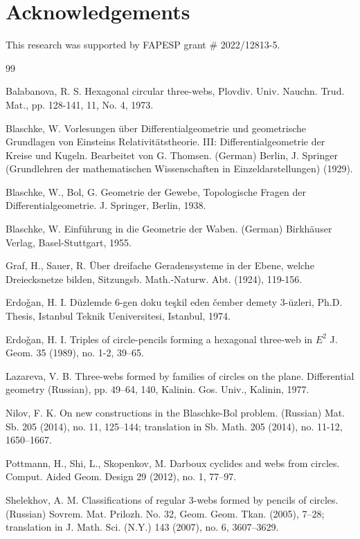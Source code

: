 \documentclass[11pt,a4paper]{article}
\begin{document}
\section*{Acknowledgements}
This research was supported by FAPESP grant \# 2022/12813-5.

\begin{thebibliography}{99}




  Balabanova, R. S. Hexagonal circular three-webs,  Plovdiv. Univ. Nauchn. Trud. Mat.,  pp. 128-141, 11, No. 4, 1973.

 Blaschke, W. 
Vorlesungen über Differentialgeometrie und geometrische Grundlagen von Einsteins Relativitätstheorie. III: Differentialgeometrie der Kreise und Kugeln. Bearbeitet von G. Thomsen. (German)  Berlin, J. Springer (Grundlehren der mathematischen Wissenschaften in Einzeldarstellungen) (1929).

 Blaschke, W.,  Bol, G.
 Geometrie der Gewebe, Topologische Fragen der
Differentialgeometrie. J. Springer, Berlin, 1938.

 Blaschke, W.  Einführung in die Geometrie der Waben. (German) Birkhäuser Verlag, Basel-Stuttgart, 1955.

 Graf, H., Sauer, R.  \"Uber dreifache
Geradensysteme in der Ebene, welche Dreiecksnetze bilden, 
Sitzungsb. Math.-Naturw. Abt. (1924), 119-156.

 Erdo\v{g}an, H. I. D\"uzlemde $6$-gen doku te\c{s}kil eden \v{c}ember demety 3-\"uzleri, Ph.D. Thesis, Istanbul Teknik Ueniversitesi, Istanbul, 1974.

 Erdo\v{g}an, H.  I.  Triples of circle-pencils forming a hexagonal three-web in $E^2$   J. Geom. 35 (1989), no. 1-2, 39–65.

 Lazareva, V. B. Three-webs formed by families of circles on the plane.  Differential geometry (Russian), pp. 49–64, 140, Kalinin. Gos. Univ., Kalinin, 1977.

 Nilov, F. K. 
On new constructions in the Blaschke-Bol problem. (Russian) 
Mat. Sb. 205 (2014), no. 11, 125–144; translation in 
Sb. Math. 205 (2014), no. 11-12, 1650–1667. 

 Pottmann, H., Shi, L., Skopenkov, M. Darboux cyclides and webs from circles. Comput. Aided Geom. Design 29 (2012), no. 1, 77--97.

 Shelekhov, A. M.  Classifications of regular 3-webs formed by pencils of circles. (Russian) Sovrem. Mat. Prilozh. No. 32, Geom. Geom. Tkan. (2005), 7--28; translation in J. Math. Sci. (N.Y.) 143 (2007), no. 6, 3607--3629.


\end{thebibliography}
\end{document}
